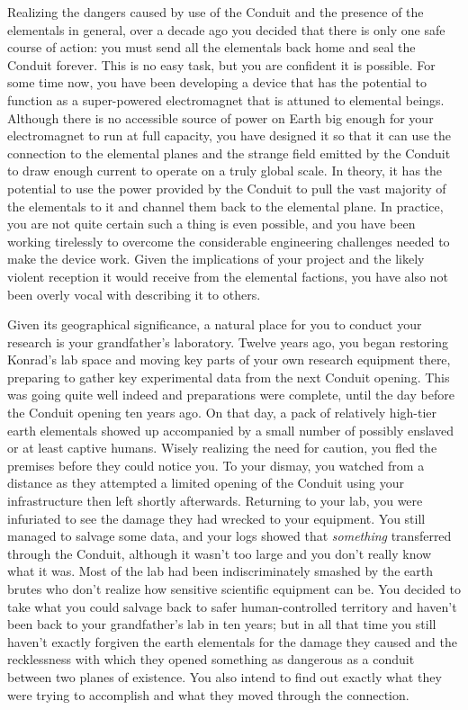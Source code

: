 \documentclass[char]{guildcamp1}
\begin{document}
Realizing the dangers caused by use of the Conduit and the presence of the elementals in general, over a decade ago you decided that there is only one safe course of action: you must send all the elementals back home and seal the Conduit forever. This is no easy task, but you are confident it is possible. For some time now, you have been developing a device that has the potential to function as a super-powered electromagnet that is attuned to elemental beings. Although there is no accessible source of power on Earth big enough for your electromagnet to run at full capacity, you have designed it so that it can use the connection to the elemental planes and the strange field emitted by the Conduit to draw enough current to operate on a truly global scale. In theory, it has the potential to use the power provided by the Conduit to pull the vast majority of the elementals to it and channel them back to the elemental plane. In practice, you are not quite certain such a thing is even possible, and you have been working tirelessly to overcome the considerable engineering challenges needed to make the device work. Given the implications of your project and the likely violent reception it would receive from the elemental factions, you have also not been overly vocal with describing it to others.

Given its geographical significance, a natural place for you to conduct your research is your grandfather's laboratory. Twelve years ago, you began restoring Konrad's lab space and moving key parts of your own research equipment there, preparing to gather key experimental data from the next Conduit opening. This was going quite well indeed and preparations were complete, until the day before the Conduit opening ten years ago. On that day, a pack of relatively high-tier earth elementals showed up accompanied by a small number of possibly enslaved or at least captive humans. Wisely realizing the need for caution, you fled the premises before they could notice you. To your dismay, you watched from a distance as they attempted a limited opening of the Conduit using your infrastructure then left shortly afterwards. Returning to your lab, you were infuriated to see the damage they had wrecked to your equipment. You still managed to salvage some data, and your logs showed that \emph{something} transferred through the Conduit, although it wasn't too large and you don't really know what it was. Most of the lab had been indiscriminately smashed by the earth brutes who don't realize how sensitive scientific equipment can be. You decided to take what you could salvage back to safer human-controlled territory and haven't been back to your grandfather's lab in ten years; but in all that time you still haven't exactly forgiven the earth elementals for the damage they caused and the recklessness with which they opened something as dangerous as a conduit between two planes of existence. You also intend to find out exactly what they were trying to accomplish and what they moved through the connection.
\end{document}
